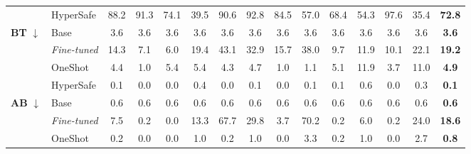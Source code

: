 \begin{table}[!t]
{\begin{tabular}{@{}l l@{\hspace{6pt}} cccc cccc cccc @{\hspace{6pt}} >{\bfseries}c@{}}
 & HyperSafe           & 88.2 & 91.3 & 74.1 & \textcolor{wingreen}{39.5}
                       & \textcolor{wingreen}{90.6} & \textcolor{wingreen}{92.8} & \textcolor{wingreen}{84.5} & \textcolor{wingreen}{57.0}
                       & 68.4 & \textcolor{wingreen}{54.3} & \textcolor{wingreen}{97.6} & \textcolor{wingreen}{35.4} & \textcolor{wingreen}{72.8} \\
\cmidrule{1-15}
\multirow{4}{*}{\textbf{BT} $\downarrow$}
 & Base                & 3.6 & 3.6 & 3.6 & 3.6 & 3.6 & 3.6 & 3.6 & 3.6 & 3.6 & 3.6 & 3.6 & 3.6 & 3.6 \\
 & \cellcolor{mutegray}\textit{Fine-tuned}
   & \cellcolor{mutegray}14.3 & \cellcolor{mutegray}7.1 & \cellcolor{mutegray}6.0 & \cellcolor{mutegray}19.4
   & \cellcolor{mutegray}43.1 & \cellcolor{mutegray}32.9 & \cellcolor{mutegray}15.7 & \cellcolor{mutegray}38.0
   & \cellcolor{mutegray}9.7 & \cellcolor{mutegray}11.9 & \cellcolor{mutegray}10.1 & \cellcolor{mutegray}22.1 & \cellcolor{mutegray}19.2 \\
 & OneShot             & \textcolor{warnred}{4.4} & 1.0 & \textcolor{warnred}{5.4} & \textcolor{warnred}{5.4} & \textcolor{warnred}{4.3} & \textcolor{warnred}{4.7} & 1.0 & 1.1 & \textcolor{warnred}{5.1} & \textcolor{warnred}{11.9} & 3.7 & \textcolor{warnred}{11.0} & \textcolor{warnred}{4.9} \\
 & HyperSafe           & \textcolor{wingreen}{0.1} & \textcolor{wingreen}{0.0} & \textcolor{wingreen}{0.0} & \textcolor{wingreen}{0.4}
                       & \textcolor{wingreen}{0.0} & \textcolor{wingreen}{0.1} & \textcolor{wingreen}{0.0} & \textcolor{wingreen}{0.1}
                       & \textcolor{wingreen}{0.1} & \textcolor{wingreen}{0.6} & \textcolor{wingreen}{0.0} & \textcolor{wingreen}{0.3} & \textcolor{wingreen}{0.1} \\
\cmidrule{1-15}
\multirow{4}{*}{\textbf{AB} $\downarrow$}
 & Base                & 0.6 & 0.6 & 0.6 & 0.6 & 0.6 & 0.6 & 0.6 & 0.6 & 0.6 & 0.6 & 0.6 & 0.6 & 0.6 \\
 & \cellcolor{mutegray}\textit{Fine-tuned}
   & \cellcolor{mutegray}7.5 & \cellcolor{mutegray}0.2 & \cellcolor{mutegray}0.0 & \cellcolor{mutegray}13.3
   & \cellcolor{mutegray}67.7 & \cellcolor{mutegray}29.8 & \cellcolor{mutegray}3.7 & \cellcolor{mutegray}70.2
   & \cellcolor{mutegray}0.2 & \cellcolor{mutegray}6.0 & \cellcolor{mutegray}0.2 & \cellcolor{mutegray}24.0 & \cellcolor{mutegray}18.6 \\
 & OneShot             & 0.2 & 0.0 & 0.0 & 1.0 & 0.2 & 1.0 & 0.0 & 3.3 & 0.2 & 1.0 & 0.0 & 2.7 & 0.8 \\

\end{tabular}}
\end{table}
